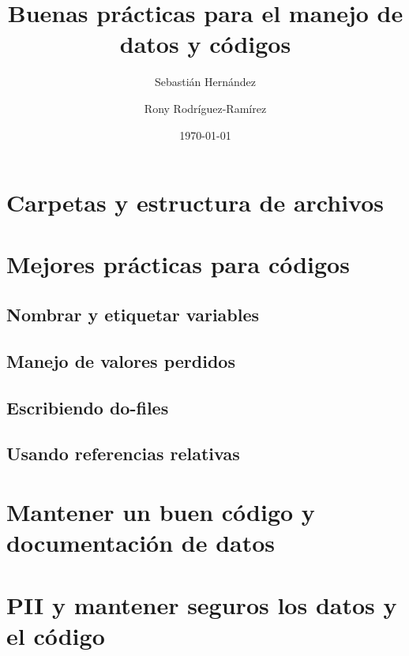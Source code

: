 \documentclass[11pt,en]{elegantpaper}
\title{Buenas prácticas para el manejo de datos y códigos}
\author{Sebastián Hernández \and Rony Rodríguez-Ramírez}
\date{\today}
\begin{document}
\maketitle
\tableofcontents

\newpage 
\section{Carpetas y estructura de archivos}
\section{Mejores prácticas para códigos}
\subsection{Nombrar y etiquetar variables}
\subsection{Manejo de valores perdidos}
\subsection{Escribiendo do-files}
\subsection{Usando referencias relativas}
\section{Mantener un buen código y documentación de datos}
\section{PII y mantener seguros los datos y el código}
\end{document}

